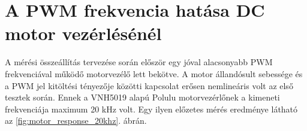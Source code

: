 

\chapter{A PWM frekvencia hatása DC motor vezérlésénél}\label{chap:effects_of_pwm_frequency}
A mérési összeállítás tervezése során először egy jóval alacsonyabb PWM frekvenciával működő 
motorvezélő lett bekötve. A motor állandósult sebessége és a PWM jel kitöltési tényezője közötti kapcsolat 
erősen nemlineáris volt az első tesztek során. Ennek a VNH5019 alapú Polulu motorvezérlőnek a kimeneti frekvenciája 
maximum 20 kHz volt. Egy ilyen előzetes mérés eredménye látható az \ref{fig:motor_response_20khz}. ábrán. 

